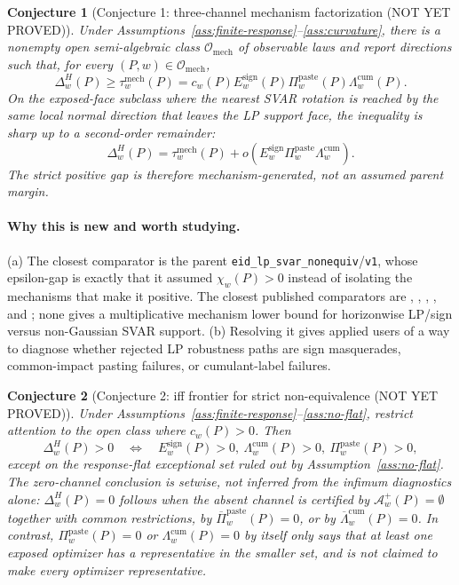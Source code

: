 \documentclass[11pt]{article}
\theoremstyle{definition}
\theoremstyle{plain}
\newtheorem{conjecture}{Conjecture}
\theoremstyle{remark}
\begin{document}
\begin{conjecture}[Conjecture 1: three-channel mechanism factorization (NOT YET PROVED)]\label{conj:mechanism-factorization}
Under Assumptions~\ref{ass:finite-response}--\ref{ass:curvature}, there is a nonempty open semi-algebraic class \(\mathcal O_{\mathrm{mech}}\) of observable laws and report directions such that, for every \((P,w)\in\mathcal O_{\mathrm{mech}}\),
\[
\Delta_w^H(P)\ge \tau_w^{\mathrm{mech}}(P)
=c_w(P)E_w^{\mathrm{sign}}(P)\Pi_w^{\mathrm{paste}}(P)\Lambda_w^{\mathrm{cum}}(P).
\]
On the exposed-face subclass where the nearest SVAR rotation is reached by the same local normal direction that leaves the LP support face, the inequality is sharp up to a second-order remainder:
\[
\Delta_w^H(P)=\tau_w^{\mathrm{mech}}(P)+o\!\left(E_w^{\mathrm{sign}}\Pi_w^{\mathrm{paste}}\Lambda_w^{\mathrm{cum}}\right).
\]
The strict positive gap is therefore mechanism-generated, not an assumed parent margin.
\end{conjecture}
\paragraph{Why this is new and worth studying.}
(a) The closest comparator is the parent \texttt{eid\_lp\_svar\_nonequiv}/\texttt{v1}, whose epsilon-gap is exactly that it assumed \(\chi_w(P)>0\) instead of isolating the mechanisms that make it positive.  The closest published comparators are \citet[Sections~2--3]{PlagborgMollerWolf2021}, \citet[Section~2]{Wolf2022}, \citet[Sections~2--3]{LanneMeitzSaikkonen2017}, \citet[Sections~2--3]{DrautzburgWright2023}, and \citet[Sections~2--3]{CarrieroMarcellinoTornese2024}; none gives a multiplicative mechanism lower bound for horizonwise LP/sign versus non-Gaussian SVAR support.  (b) Resolving it gives applied users of \citet{DrautzburgWright2023} a way to diagnose whether rejected LP robustness paths are sign masquerades, common-impact pasting failures, or cumulant-label failures.

\begin{conjecture}[Conjecture 2: iff frontier for strict non-equivalence (NOT YET PROVED)]\label{conj:iff-frontier}
Under Assumptions~\ref{ass:finite-response}--\ref{ass:no-flat}, restrict attention to the open class where \(c_w(P)>0\).  Then
\[
\Delta_w^H(P)>0
\quad\Longleftrightarrow\quad
E_w^{\mathrm{sign}}(P)>0,
\ \Lambda_w^{\mathrm{cum}}(P)>0,
\ \Pi_w^{\mathrm{paste}}(P)>0,
\]
except on the response-flat exceptional set ruled out by Assumption~\ref{ass:no-flat}.
The zero-channel conclusion is setwise, not inferred from the infimum diagnostics alone: \(\Delta_w^H(P)=0\) follows when the absent channel is certified by \(\mathcal A_w^+(P)=\emptyset\) together with common restrictions, by \(\overline\Pi_w^{\mathrm{paste}}(P)=0\), or by \(\overline\Lambda_w^{\mathrm{cum}}(P)=0\).  In contrast, \(\Pi_w^{\mathrm{paste}}(P)=0\) or \(\Lambda_w^{\mathrm{cum}}(P)=0\) by itself only says that at least one exposed optimizer has a representative in the smaller set, and is not claimed to make every optimizer representative.
\end{conjecture}
\end{document}
